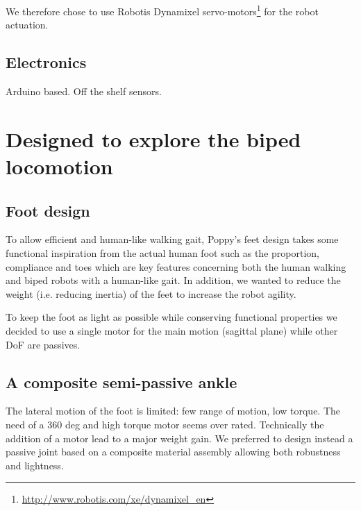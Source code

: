 We therefore chose to use Robotis Dynamixel servo-motors\footnote{\url{http://www.robotis.com/xe/dynamixel_en}} for the robot actuation.


\subsection{Electronics} %
Arduino based.
Off the shelf sensors.






\section{Designed to explore the biped locomotion}

\subsection{Foot design} %
To allow efficient and human-like walking gait, Poppy's feet design takes some functional inspiration from the actual human foot such as the proportion, compliance and toes which are key features concerning both the human walking and biped robots with a human-like gait.
In addition, we wanted to reduce the weight (i.e.
reducing inertia) of the feet to increase the robot agility.

To keep the foot as light as possible while conserving functional properties we decided to use a single motor for the main motion (sagittal plane) while other DoF are passives.

\subsection{A composite semi-passive ankle} %
The lateral motion of the foot is limited: few range of motion, low torque.
The need of a 360 deg and high torque motor seems over rated.
Technically the addition of a motor lead to a major weight gain.
We preferred to design  instead a passive joint based on a composite material assembly allowing both robustness and lightness.


